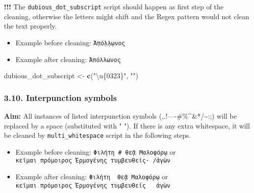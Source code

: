 \documentclass[]{article}
\newenvironment{Shaded}{\begin{snugshade}}{\end{snugshade}}
\newcommand{\CharTok}[1]{\textcolor[rgb]{0.31,0.60,0.02}{#1}}
\newcommand{\KeywordTok}[1]{\textcolor[rgb]{0.13,0.29,0.53}{\textbf{#1}}}
\newcommand{\NormalTok}[1]{#1}
\newcommand{\StringTok}[1]{\textcolor[rgb]{0.31,0.60,0.02}{#1}}
\providecommand{\tightlist}{%
  \setlength{\itemsep}{0pt}\setlength{\parskip}{0pt}}
\begin{document}
\textbf{!!!} The \texttt{dubious\_dot\_subscript} script should happen
as first step of the cleaning, otherwise the letters might shift and the
Regex pattern would not clean the text properly.

\begin{itemize}
\tightlist
\item
  Example before cleaning: \texttt{Ἀ̣πό̣λ̣λ̣ωνος}
\item
  Example after cleaning: \texttt{Ἀπόλλωνος}
\end{itemize}

\begin{Shaded}
\begin{Highlighting}[]
\NormalTok{dubious_dot_subscript <-}\StringTok{ }\KeywordTok{c}\NormalTok{(}\StringTok{"\textbackslash{}u\{0323\}"}\NormalTok{, }\StringTok{""}\NormalTok{)}
\end{Highlighting}
\end{Shaded}

\hypertarget{interpunction-symbols}{%
\subsubsection{3.10. Interpunction
symbols}\label{interpunction-symbols}}

\textbf{Aim:} All instances of listed interpunction symbols
(,.!----\#\%\^{}\&*/\textasciitilde{}:;) will be replaced by a space
(substituted with " "). If there is any extra whitespace, it will be
cleaned by \texttt{multi\_whitespace} script in the following steps.

\begin{itemize}
\tightlist
\item
  Example before cleaning: \texttt{Φιλήτη\ \#\ θεᾷ\ Μαλοφόρῳ} or
  \texttt{κεῖμαι\ πρόμοιρος\ Ἑρμογένης\ τυμβευθείς·\ /ἀγὼν}
\item
  Example after cleaning: \texttt{Φιλήτη\ \ θεᾷ\ Μαλοφόρῳ} or
  \texttt{κεῖμαι\ πρόμοιρος\ Ἑρμογένης\ τυμβευθείς\ \ \ ἀγὼν}
\end{itemize}

\begin{Shaded}
\end{Shaded}
\end{document}

